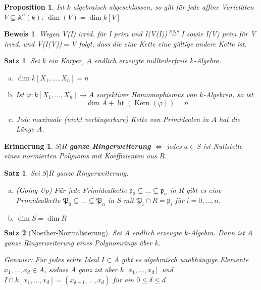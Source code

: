 \documentclass[a4paper, 12pt, numbers=noendperiod, chapterprefix=true]{scrbook}
\theoremstyle{break}
\newtheorem{Satz}{Satz}
\newtheorem{UnterSatz}{Satz}[Satz]
\newtheorem{Prop}[Def]{Proposition}
\theoremstyle{nonumberbreak}
\newtheorem{nnErinn}{Erinnerung}
\newtheorem{Bew}{Beweis}
\theoremstyle{nonumberplain}
\newcommand{\quot}[1]{\textrm{\glqq}{#1}\textrm{\grqq}}
\newcommand{\emp}[1]{\textbf{\emph{#1}}}
\newcommand{\deftermspec}[2]{{\index{#2}}\emp{#1}}
\DeclareMathOperator{\Kern}{Kern}
\DeclareMathOperator{\Ht}{ht}
\newcommand{\A}{\mathbb{A}}
\begin{document}
\begin{Prop}
Ist $k$ algebraisch abgeschlossen, so gilt f\"ur jede affine Variet\"aten $V\subseteq\A^n(k)$: $\dim(V)=\dim k[V]$
\end{Prop}

\begin{Bew}
Wegen V(I) irred. für I prim und I(V(I))$\overset{\textrm{HNS}}{=}$I sowie I(V) prim für V irred. und V(I(V))$=$V folgt, dass die eine Kette eine gültige andere Kette ist.
\end{Bew}

\begin{Satz}
Sei $k$ ein K\"orper, $A$ endlich erzeugte nullteilerfreie $k$-Algebra.\begin{enumerate}[a)]
\item
	$\dim k[X_1,\ldots ,X_n]=n$
\item
	Ist $\varphi:k[X_1,\ldots ,X_n]\to A$ surjektiver Homomophismus von $k$-Algebren, so ist \[\dim A +\Ht(\Kern(\varphi))=n\]
\item
	Jede maximale (nicht verl\"angerbare) Kette von Primidealen in $A$ hat die L\"ange $A$.
\end{enumerate}\end{Satz}

\begin{nnErinn}
$S|R$ \deftermspec{ganze Ringerweiterung}{Ring!-erweiterung!ganze} $\Leftrightarrow$ jedes $a\in S$ ist Nullstelle eines \emph{normierten} Polynoms mit Koeffizienten aus $R$.
\end{nnErinn}

\begin{UnterSatz}\label{satz9.1}
Sei $S|R$ ganze Ringerweiterung.\begin{enumerate}[a)]
\item\label{satz9.1a}
	(\quot{Going Up}) F\"ur jede Primidealkette $\mathfrak p_0\subsetneq\ldots \subsetneq \mathfrak p_n$ in $R$ gibt es eine Primidealkette $\mathfrak P_0\subsetneq\ldots \subsetneq \mathfrak P_n$ in $S$ mit $\mathfrak P_i\cap R=\mathfrak p_i$ f\"ur $i=0,\ldots ,n$.
\item
	$\dim S = \dim R$
\end{enumerate}\end{UnterSatz}

\begin{UnterSatz}[\quot{Noether-Normalisierung}]
Sei $A$ endlich erzeugte $k$-Algebra. Dann ist $A$ ganze Ringerweiterung eines Polynomrings \"uber $k$.

\emph{Genauer:} F\"ur jedes echte Ideal $I\subset A$ gibt es algebraisch unabh\"angige Elemente $x_1,\ldots ,x_d\in A$, sodass $A$ ganz ist \"uber $k[x_1,\ldots ,x_d]$ und $I\cap k[x_1,\ldots ,x_d]=(x_{\delta+1},\ldots ,x_d)$ f\"ur ein $0\le\delta\le d$.
\end{UnterSatz}
\end{document}
